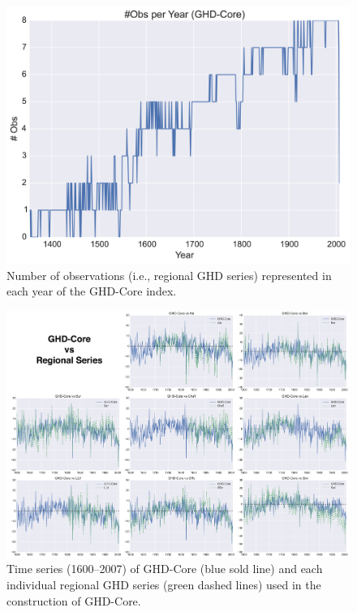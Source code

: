 \documentclass[12pt]{article}
\begin{document}
\begin{figure}
\center
\includegraphics[width=1.0\columnwidth,scale=2]{SUPP_fig_02_numobs.png}
\caption{Number of observations (i.e., regional GHD series) represented in each year of the GHD-Core index.}
\end{figure}

\begin{figure}
\center
\includegraphics[width=1.0\columnwidth,scale=2]{SUPP_fig_03_core_vs_sites.png}
\caption{Time series (1600--2007) of GHD-Core (blue sold line) and each individual regional GHD series (green dashed lines) used in the construction of GHD-Core.}
\end{figure}
\end{document}
